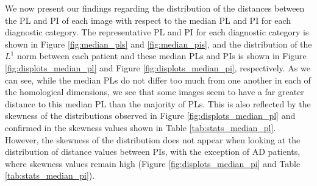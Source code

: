 \documentclass{article}
\begin{document}
We now present our findings regarding the distribution of the distances between the PL and PI of each image with respect to the median PL and PI for each diagnostic category. The representative PL and PI for each diagnostic category is shown in Figure \ref{fig:median_pls} and \ref{fig:median_pis}, and the distribution of the $L^1$ norm between each patient and these median PLs and PIs is shown in Figure \ref{fig:displots_median_pl} and Figure \ref{fig:displots_median_pi}, respectively. As we can see, while the median PLs do not differ too much from one another in each of the homological dimensions, we see that some images seem to have a far greater distance to this median PL than the majority of PLs. This is also reflected by the skewness of the distributions observed in Figure \ref{fig:displots_median_pl} and confirmed in the skewness values shown in Table \ref{tab:stats_median_pl}. However, the skewness of the distribution does not appear when looking at the distribution of distance values between PIs, with the exception of AD patients, where skewness values remain high (Figure \ref{fig:displots_median_pi} and Table \ref{tab:stats_median_pi}).
\end{document}
